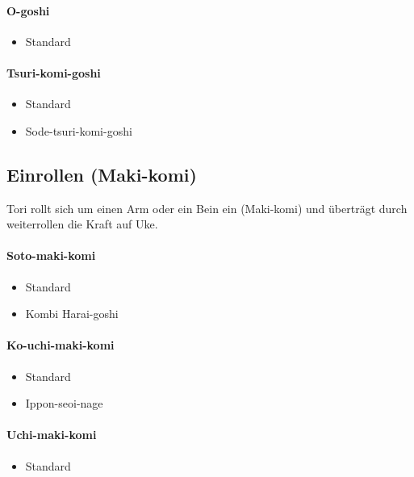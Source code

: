 \documentclass[justified, a4paper, notitlepage, captions=tableheading, nobib]{tufte-handout}
\begin{document}
\paragraph{O-goshi }
\label{sec:org8f7ed2a}
\begin{itemize}
\item Standard
\end{itemize}

\paragraph{Tsuri-komi-goshi}
\label{sec:orgaa1f4ec}
\begin{itemize}
\item Standard
\item Sode-tsuri-komi-goshi
\end{itemize}

\subsection{Einrollen (Maki-komi) }
\label{sec:org1ce7910}
Tori rollt sich um einen Arm oder ein Bein ein (Maki-komi) und überträgt durch weiterrollen die Kraft auf Uke.

\paragraph{Soto-maki-komi }
\label{sec:orgaba589c}
\begin{itemize}
\item Standard
\item Kombi Harai-goshi
\end{itemize}

\paragraph{Ko-uchi-maki-komi }
\label{sec:org100dd42}
\begin{itemize}
\item Standard
\item Ippon-seoi-nage
\end{itemize}

\paragraph{Uchi-maki-komi}
\label{sec:orgacba8b4}
\begin{itemize}
\item Standard
\end{itemize}
\end{document}
